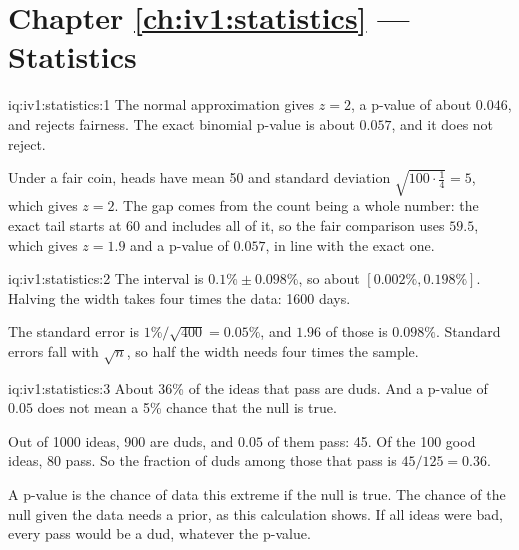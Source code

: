 \section*{Chapter \ref{ch:iv1:statistics} --- Statistics}

\begin{solution}{iq:iv1:statistics:1}
The normal approximation gives $z = 2$, a p-value of about $0.046$, and rejects fairness. The exact binomial p-value is about $0.057$, and it does not reject.

Under a fair coin, heads have mean 50 and standard deviation $\sqrt{100 \cdot \frac14} = 5$, which gives $z = 2$. The gap comes from the count being a whole number: the exact tail starts at 60 and includes all of it, so the fair comparison uses $59.5$, which gives $z = 1.9$ and a p-value of $0.057$, in line with the exact one.

\end{solution}

\begin{solution}{iq:iv1:statistics:2}
The interval is $0.1\% \pm 0.098\%$, so about $[0.002\%, 0.198\%]$. Halving the width takes four times the data: 1600 days.

The standard error is $1\%/\sqrt{400} = 0.05\%$, and $1.96$ of those is $0.098\%$. Standard errors fall with $\sqrt{n}$, so half the width needs four times the sample.

\end{solution}

\begin{solution}{iq:iv1:statistics:3}
About 36\% of the ideas that pass are duds. And a p-value of $0.05$ does not mean a 5\% chance that the null is true.

Out of 1000 ideas, 900 are duds, and $0.05$ of them pass: 45. Of the 100 good ideas, 80 pass. So the fraction of duds among those that pass is $45/125 = 0.36$.

A p-value is the chance of data this extreme if the null is true. The chance of the null given the data needs a prior, as this calculation shows. If all ideas were bad, every pass would be a dud, whatever the p-value.

\end{solution}

